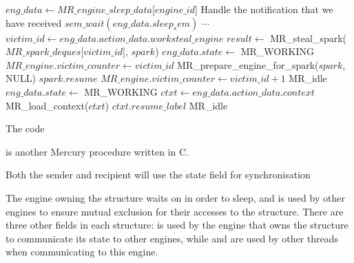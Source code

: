 \begin{algorithm}
\begin{algorithmic}
        \State $eng\_data \gets MR\_engine\_sleep\_data$[$engine\_id$]
            \State Handle the notification that we have received
        \EndIf
        \State $sem\_wait(eng\_data.sleep_sem)$
            \State $\cdots$
          \EndCase
            \State $victim\_id \gets
                eng\_data.action\_data.worksteal\_engine$
            \Repeat
                \State $result \gets$
                    MR\_steal\_spark($MR\_spark\_deques$[$victim\_id$],
                        \text{\code{\&}}$spark$)
                \State $eng\_data.state \gets$ MR\_WORKING
                \State $MR\_engine.victim\_counter \gets victim\_id$
                \State MR\_prepare\_engine\_for\_spark($spark$, NULL)
                \Goto $spark.resume$
            \Else {}
                \State $MR\_engine.victim\_counter \gets victim\_id + 1$
                \Goto MR\_idle
            \EndIf
          \EndCase
            \State $eng\_data.state \gets$ MR\_WORKING
            \State $ctxt \gets eng\_data.action\_data.context$
            \State MR\_load\_context($ctxt$)
            \Goto $ctxt.resume\_label$
          \EndCase
            \Goto MR\_idle
          \EndCase
        \EndSwitch
    \EndProcedure
\end{algorithmic}
\caption{The \sleep code}
\end{algorithm}


\sleep is another Mercury procedure written in C.

Both the sender and recipient will use the state field for synchronisation  


The engine owning the structure waits on  in order to
sleep,
and  is used by other engines to ensure mutual exclusion for
their accesses to the \enginesleepsync structure.
There are three other fields in each structure:
 is used by the engine that owns the structure to communicate
its state to other engines,
while  and  are used by other threads when
communicating to this engine.


